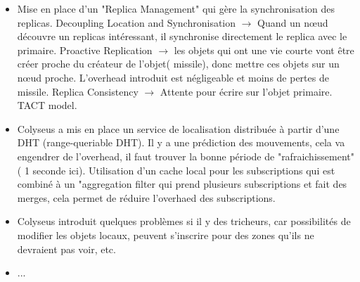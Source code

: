 \documentclass[11pt,a4paper]{article}
\begin{document}
\begin{itemize}
	\item Mise en place d'un "Replica Management" qui gère la synchronisation des replicas. Decoupling Location and Synchronisation $\rightarrow$ Quand un nœud découvre un replicas intéressant, il synchronise directement le replica avec le primaire.
	Proactive Replication $\rightarrow$ les objets qui ont une vie courte vont être créer proche du créateur de l'objet( missile), donc mettre ces objets sur un nœud proche. L'overhead introduit est négligeable et moins de pertes de missile.
	Replica Consistency $\rightarrow$ Attente pour écrire sur l'objet primaire. TACT model. 
	\item Colyseus a mis en place un service de localisation distribuée à partir d'une DHT (range-queriable DHT). Il y a une prédiction des mouvements, cela va engendrer de l'overhead, il faut trouver la bonne période de "rafraichissement" ( 1 seconde ici). Utilisation d'un cache local pour les subscriptions qui est combiné à un "aggregation filter qui prend plusieurs subscriptions et fait des merges, cela permet de réduire l'overhaed des subscriptions. 
	\item Colyseus introduit quelques problèmes si il y des tricheurs, car possibilités de modifier les objets locaux, peuvent s'inscrire pour des zones qu'ils ne devraient pas voir, etc. 
	\item ...
  \end{itemize}
\end{document}
